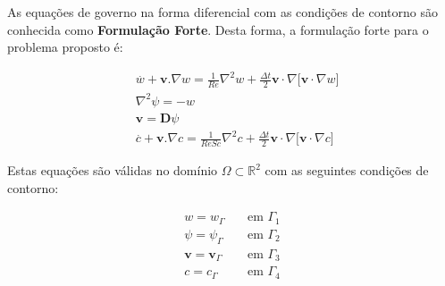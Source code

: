 As equações de governo na forma diferencial 
com as condições de contorno
são conhecida como \textbf{Formulação Forte}.
Desta forma, a formulação forte para
o problema proposto é:

\begin{align}
& \overset{.}{w} + \textbf{v}.\nabla w = \frac{1}{Re} \nabla^2 w 
 + \frac{\Delta t}{2} \textbf{v} \cdot \nabla \big[ \textbf{v} \cdot \nabla w \big] \label{vorticity taylor-galerkin} \\[10pt]
& \nabla^2 \psi = - w \\[10pt]
& \textbf{v} = \textbf{D}\psi \\[10pt]
& \overset{.}{c} + \textbf{v}.\nabla c = \frac{1}{ReSc} \nabla^2 c
 + \frac{\Delta t}{2} \textbf{v} \cdot \nabla \big[ \textbf{v} \cdot \nabla c \big] \label{concentration taylor-galerkin}
\end{align}


\medskip
\noindent
Estas equações são válidas no domínio $\Omega \subset \mathbb{R}^2$
com as seguintes condições de contorno:

\begin{equation} \label{bc}
 \begin{aligned}
  w = w_\Gamma \quad & \mbox{em $\Gamma_1$}\\
  \psi = \psi_\Gamma \quad & \mbox{em $\Gamma_2$}\\
  \textbf{v} = \textbf{v}_\Gamma \quad & \mbox{em $\Gamma_3$}\\
  c = c_\Gamma \quad & \mbox{em $\Gamma_4$}
\end{aligned}
\end{equation}

